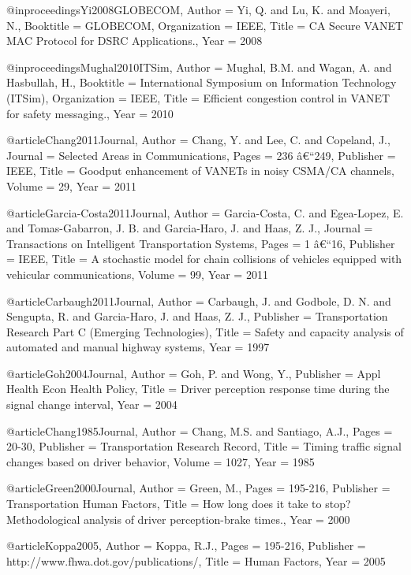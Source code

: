 {{{{{{@inproceedings{Yi2008GLOBECOM,
	Author = {Yi, Q. and Lu, K. and Moayeri, N.},
	Booktitle = {GLOBECOM},
	Organization = {IEEE},
	Title = {CA Secure VANET MAC Protocol for DSRC Applications.},
	Year = {2008}}

@inproceedings{Mughal2010ITSim,
	Author = {Mughal, B.M. and Wagan, A. and Hasbullah, H.},
	Booktitle = {International Symposium on Information Technology (ITSim)},
	Organization = {IEEE},
	Title = {Efficient congestion control in VANET for safety messaging.},
	Year = {2010}}

@article{Chang2011Journal,
	Author = {Chang, Y. and Lee, C. and Copeland, J.},
	Journal = {Selected Areas in Communications},
	Pages = {236 â€“249},
	Publisher = {IEEE},
	Title = {Goodput enhancement of VANETs in noisy CSMA/CA channels},
	Volume = {29},
	Year = {2011}}

@article{Garcia-Costa2011Journal,
	Author = {Garcia-Costa, C. and Egea-Lopez, E. and Tomas-Gabarron, J. B. and Garcia-Haro, J. and Haas, Z. J.},
	Journal = {Transactions on Intelligent Transportation Systems},
	Pages = {1 â€“16},
	Publisher = {IEEE},
	Title = {A stochastic model for chain collisions of vehicles equipped with vehicular communications},
	Volume = {99},
	Year = {2011}}

@article{Carbaugh2011Journal,
	Author = {Carbaugh, J. and Godbole,  D. N. and Sengupta, R. and Garcia-Haro, J. and Haas, Z. J.},
	Publisher = {Transportation Research Part C (Emerging Technologies)},
	Title = {Safety and capacity analysis of automated and manual highway systems},
	Year = {1997}}

@article{Goh2004Journal,
	Author = {Goh, P. and Wong, Y.},
	Publisher = {Appl Health Econ Health Policy},
	Title = {Driver perception response time during the signal change interval},
	Year = {2004}}

@article{Chang1985Journal,
	Author = {Chang, M.S. and Santiago, A.J.},
	Pages = {20-30},
	Publisher = {Transportation Research Record},
	Title = {Timing traffic signal changes based on driver behavior},
	Volume = {1027},
	Year = {1985}}

@article{Green2000Journal,
	Author = {Green, M.},
	Pages = {195-216},
	Publisher = {Transportation Human Factors},
	Title = {How long does it take to stop? Methodological analysis of driver perception-brake times.},
	Year = {2000}}

@article{Koppa2005,
	Author = {Koppa, R.J.},
	Pages = {195-216},
	Publisher = {http://www.fhwa.dot.gov/publications/},
	Title = {Human Factors},
	Year = {2005}}

}}}}}}
